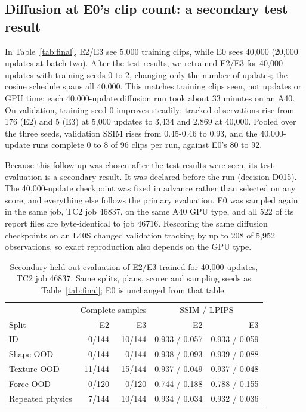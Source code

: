\documentclass[11pt,a4paper]{article}
\begin{document}
\subsection{Diffusion at E0's clip count: a secondary test result}
\label{sec:d015}
In Table~\ref{tab:final}, E2/E3 see 5,000 training clips, while E0 sees 40,000 (20,000 updates at batch two). After the test results, we retrained E2/E3 for 40,000 updates with training seeds 0 to 2, changing only the number of updates; the cosine schedule spans all 40,000. This matches training clips seen, not updates or GPU time: each 40,000-update diffusion run took about 33 minutes on an A40. On validation, training seed 0 improves steadily: tracked observations rise from 176 (E2) and 5 (E3) at 5,000 updates to 3,434 and 2,869 at 40,000. Pooled over the three seeds, validation SSIM rises from 0.45-0.46 to 0.93, and the 40,000-update runs complete 0 to 8 of 96 clips per run, against E0's 80 to 92.

Because this follow-up was chosen after the test results were seen, its test evaluation is a secondary result. It was declared before the run (decision D015). The 40,000-update checkpoint was fixed in advance rather than selected on any score, and everything else follows the primary evaluation. E0 was sampled again in the same job, TC2 job 46837, on the same A40 GPU type, and all 522 of its report files are byte-identical to job 46716. Rescoring the same diffusion checkpoints on an L40S changed validation tracking by up to 208 of 5,952 observations, so exact reproduction also depends on the GPU type.

\begin{table}[!ht]
\centering
\begin{tabular}{lrrrr}
\hline
 & \multicolumn{2}{c}{Complete samples} & \multicolumn{2}{c}{SSIM / LPIPS} \\
Split & E2 & E3 & E2 & E3 \\
\hline
ID & 0/144 & 10/144 & 0.933 / 0.057 & 0.933 / 0.059 \\
Shape OOD & 0/144 & 0/144 & 0.938 / 0.093 & 0.939 / 0.088 \\
Texture OOD & 11/144 & 15/144 & 0.937 / 0.049 & 0.937 / 0.048 \\
Force OOD & 0/120 & 0/120 & 0.744 / 0.188 & 0.788 / 0.155 \\
Repeated physics & 7/144 & 10/144 & 0.934 / 0.034 & 0.932 / 0.036 \\
\hline
\end{tabular}
\caption{Secondary held-out evaluation of E2/E3 trained for 40,000 updates, TC2 job 46837. Same splits, plans, scorer and sampling seeds as Table~\ref{tab:final}; E0 is unchanged from that table.}
\label{tab:d015}
\end{table}
\end{document}
